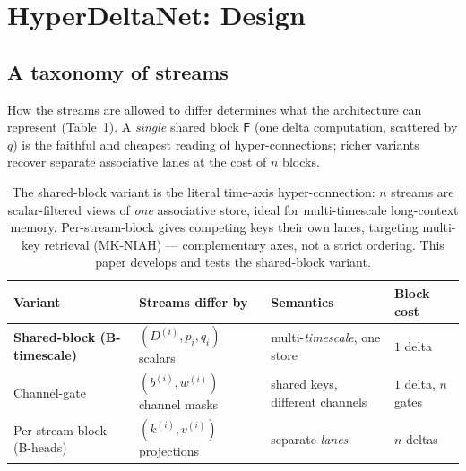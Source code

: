 \documentclass[11pt,letterpaper,logo]{yalearxiv}
\newcommand{\Fdelta}{\mathsf{F}}               %
\begin{document}
\section{HyperDeltaNet: Design}
\label{sec:design}

\subsection{A taxonomy of streams}
How the streams are allowed to differ determines what the architecture can
represent (Table~\ref{tab:streams}). A \emph{single} shared block $\Fdelta$ (one
delta computation, scattered by $q$) is the faithful and cheapest reading of
hyper-connections; richer variants recover separate associative lanes at the cost
of $n$ blocks.

\begin{table}[t]
\centering
\small
\begin{tabular}{@{}llll@{}}
\toprule
Variant & Streams differ by & Semantics & Block cost \\
\midrule
\textbf{Shared-block (B-timescale)} & $(D^{(i)}, p_i, q_i)$ scalars & multi-\emph{timescale}, one store & $1$ delta \\
Channel-gate & $(b^{(i)}, w^{(i)})$ channel masks & shared keys, different channels & $1$ delta, $n$ gates \\
Per-stream-block (B-heads) & $(k^{(i)}, v^{(i)})$ projections & separate \emph{lanes} & $n$ deltas \\
\bottomrule
\end{tabular}
\caption{The shared-block variant is the literal time-axis hyper-connection: $n$
streams are scalar-filtered views of \emph{one} associative store, ideal for
multi-timescale long-context memory. Per-stream-block gives competing keys their
own lanes, targeting multi-key retrieval (MK-NIAH) --- complementary axes, not a
strict ordering. This paper develops and tests the shared-block variant.}
\label{tab:streams}
\end{table}
\end{document}
